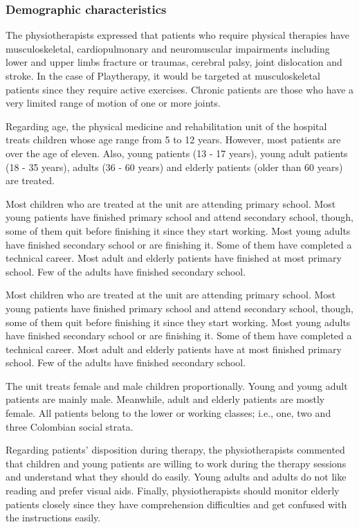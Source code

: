 \subsubsection{Demographic characteristics}
The physiotherapists expressed that patients who require physical therapies have musculoskeletal, cardiopulmonary and neuromuscular impairments including lower and upper limbs fracture or traumas, cerebral palsy, joint dislocation and stroke. In the case of Playtherapy, it would be targeted at musculoskeletal patients since they require active exercises. Chronic patients are those who have a very limited range of motion of one or more joints.

Regarding age, the physical medicine and rehabilitation unit of the hospital treats children whose age range from 5 to 12 years. However, most patients are over the age of eleven. Also, young patients (13 - 17 years), young adult patients (18 - 35 years), adults (36 - 60 years) and elderly patients (older than 60 years) are treated.

Most children who are treated at the unit are attending primary school. Most young patients have finished primary school and attend secondary school, though, some of them quit before finishing it since they start working. Most young adults have finished secondary school or are finishing it. Some of them have completed a technical career. Most adult and elderly patients have finished at most primary school. Few of the adults have finished secondary school.

Most children who are treated at the unit are attending primary school. Most young patients have finished primary school and attend secondary school, though, some of them quit before finishing it since they start working. Most young adults have finished secondary school or are finishing it. Some of them have completed a technical career. Most adult and elderly patients have at most finished primary school. Few of the adults have finished secondary school.

The unit treats female and male children proportionally. Young and young adult patients are mainly male. Meanwhile, adult and elderly patients are mostly female. All patients belong to the lower or working classes; i.e., one, two and three Colombian social strata.

Regarding patients' disposition during therapy, the physiotherapists commented that children and young patients are willing to work during the therapy sessions and understand what they should do easily. Young adults and adults do not like reading and prefer visual aids. Finally, physiotherapists should monitor elderly patients closely since they have comprehension difficulties and get confused with the instructions easily.

